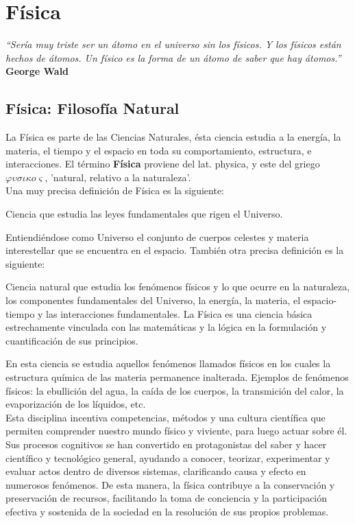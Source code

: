 \documentclass[a5paper,pagesize,10pt,bibtotoc,pointlessnumbers,
normalheadings,DIV=9,fleqn,x11names,table,twoside=false]{scrbook}
\begin{document}
\chapter{Física}

\textit{``Sería muy triste ser un átomo en el universo sin los físicos. Y los físicos están hechos de átomos. Un físico es la 
forma de un átomo de saber que hay átomos.''} \textbf{George Wald}
\vspace{1.0 cm}

\section{Física: Filosofía Natural}

La Física es parte de las Ciencias Naturales, ésta ciencia estudia a la energía, la materia, el tiempo y el espacio en toda su 
comportamiento, estructura, e interacciones. El término \textbf{Física} proviene del lat. physica, y este del griego 
$\varphi\upsilon\sigma\iota\kappa o\varsigma$, 'natural, relativo a la naturaleza'.\\

Una muy precisa definición de Física es la siguiente:

\begin{tcolorbox}
Ciencia que estudia las leyes fundamentales que rigen el Universo.
\end{tcolorbox}

Entiendiéndose como Universo el conjunto de cuerpos celestes y materia interestellar que se encuentra en el espacio. También otra 
precisa definición es la siguiente:

\begin{tcolorbox}
Ciencia natural que estudia los fenómenos físicos y lo que ocurre en la naturaleza, los componentes fundamentales del Universo, la 
energía, la materia, el espacio-tiempo y las interacciones fundamentales. La Física es una ciencia básica estrechamente vinculada 
con las matemáticas y la lógica en la formulación y cuantificación de sus principios.
\end{tcolorbox}

En esta ciencia se estudia aquellos fenómenos llamados físicos en los cuales la estructura química de las materia permanence 
inalterada. Ejemplos de fenómenos físicos: la ebullición del agua, la caída de los cuerpos, la transmición del calor, la 
evaporización de los líquidos, etc.\\

Esta disciplina incentiva competencias, métodos y una cultura científica que permiten comprender nuestro mundo físico y viviente, 
para luego actuar sobre él. Sus procesos cognitivos se han convertido en protagonistas del saber y hacer científico y tecnológico 
general, ayudando a conocer, teorizar, experimentar y evaluar actos dentro de diversos sistemas, clarificando causa y efecto en 
numerosos fenómenos. De esta manera, la física contribuye a la conservación y preservación de recursos, facilitando la toma de 
conciencia y la participación efectiva y sostenida de la sociedad en la resolución de sus propios problemas.\\
\end{document}
